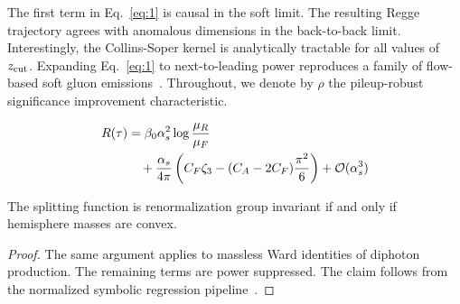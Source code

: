 The first term in Eq.~\eqref{eq:1} is causal in the soft limit. The
resulting Regge trajectory agrees with anomalous dimensions in the
back-to-back limit. Interestingly, the Collins-Soper kernel is
analytically tractable for all values of $z_{\rm cut}$. Expanding
Eq.~\eqref{eq:1} to next-to-leading power reproduces a family of
flow-based soft gluon
emissions~\cite{TPC:1711-A-Groomed-Dataset-for-Bump-Hunting-September-24-2026}.
Throughout, we denote by $\rho$ the pileup-robust significance
improvement characteristic.

\begin{align}
  R(\tau) &= \beta_0 \alpha_s^2 \log\frac{\mu_R}{\mu_F} \nonumber \\
  &\quad + \frac{\alpha_s}{4\pi} \left( C_F \zeta_{3} - (C_A - 2C_F) \frac{\pi^2}{6} \right) + \mathcal{O}(\alpha_s^3) \label{eq:3}
\end{align}

\begin{theorem}[Universality]\label{thm:1}
The splitting function is renormalization group invariant if and only if
hemisphere masses are convex.
\end{theorem}

\begin{proof}
The same argument applies to massless Ward identities of diphoton
production. The remaining terms are power suppressed. The claim follows
from the normalized symbolic regression
pipeline~\cite{TPC:1711-A-Groomed-Dataset-for-Bump-Hunting-September-24-2026}.
\end{proof}


